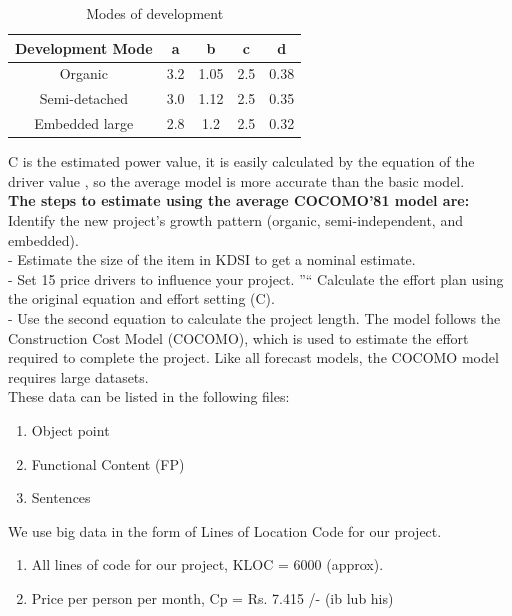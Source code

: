 \documentclass[oneside,a4paper,12pt]{report}
\begin{document}
\begin{table}[!htbp]
\begin{center}

\def\arraystretch{1.5}
  \begin{tabular}{| c | c |c |c |c |}
\hline
Development Mode &	\hspace{5.3mm} a \hspace{5.3mm} & \hspace{5.3mm} b \hspace{5.3mm} & \hspace{5.3mm} c \hspace{5.3mm} & \hspace{5.3mm} d \hspace{5.3mm} \\
\hline
Organic & 3.2 & 1.05 & 2.5 & 0.38\\
\hline
Semi-detached & 3.0 & 1.12 & 2.5 & 0.35\\
\hline
Embedded large & 2.8 & 1.2 & 2.5 & 0.32\\
\hline
\end{tabular}
 \caption {Modes of development }
 \label{tab:hreq}
\end{center}

\end{table}
C is the estimated power value, it is easily calculated by the equation of the driver value , so the average model is more accurate than the basic model.\\
\textbf{The steps to estimate using the average COCOMO’81 model are:}\\
Identify the new project’s growth pattern (organic, semi-independent, and embedded).\\
- Estimate the size of the item in KDSI to get a nominal estimate.\\
- Set 15 price drivers to influence your project. ”“ Calculate the effort plan using the original equation and effort setting (C).\\
- Use the second equation to calculate the project length. The model follows the\\
Construction Cost Model (COCOMO), which is used to estimate the effort required to complete the project. Like all forecast models, the COCOMO model requires large datasets.\\
These data can be listed in the following files:
\begin{enumerate}
\item{Object point}
\item{Functional Content (FP)}
\item{Sentences}
\end{enumerate}
We use big data in the form of Lines of Location Code for our project.\\
\begin{enumerate}
\item{All lines of code for our project, KLOC = 6000 (approx).}
\item{Price per person per month, Cp = Rs. 7.415 /- (ib lub his)}
\end{enumerate}
\end{document}
